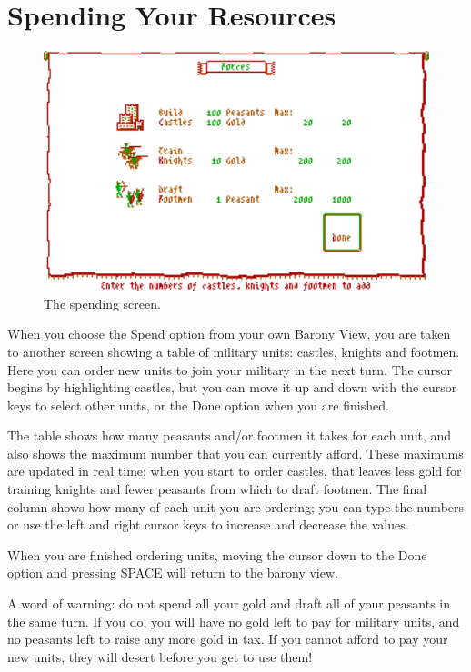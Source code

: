 \documentclass[8pt]{extarticle}
\begin{document}
%
%

\pagebreak %
\section*{Spending Your Resources}

\begin{figure}
  \centering
  \includegraphics[width=\textwidth]{spend}
  \caption*{The spending screen.}
  \label{fig:title}
\end{figure}

\begin{multicols}{2}
\noindent
When you choose the Spend option from your own Barony View, you are taken to another screen showing a table of military units: castles, knights and footmen. Here you can order new units to join your military in the next turn. The cursor begins by highlighting castles, but you can move it up and down with the cursor keys to select other units, or the Done option when you are finished.

The table shows how many peasants and/or footmen it takes for each unit, and also shows the maximum number that you can currently afford. These maximums are updated in real time; when you start to order castles, that leaves less gold for training knights and fewer peasants from which to draft footmen. The final column shows how many of each unit you are ordering; you can type the numbers or use the left and right cursor keys to increase and decrease the values.

When you are finished ordering units, moving the cursor down to the Done option and pressing SPACE will return to the barony view.

A word of warning: do not spend all your gold and draft all of your peasants in the same turn. If you do, you will have no gold left to pay for military units, and no peasants left to raise any more gold in tax. If you cannot afford to pay your new units, they will desert before you get to use them!
\end{multicols}
\end{document}
